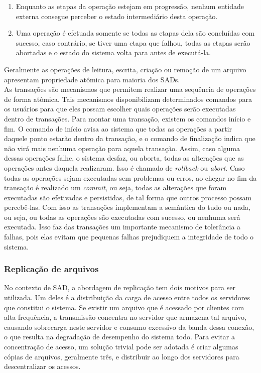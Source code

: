 	\begin{enumerate}
	\item Enquanto as etapas da operação estejam em progressão, nenhum entidade externa consegue perceber o estado intermediário desta operação.
	\item Uma operação é efetuada somente se todas as etapas dela são concluídas com sucesso, caso contrário, se tiver uma etapa que falhou, todas as etapas serão abortadas e o estado do sistema volta para antes de executá-la.
	\end{enumerate}
	
	Geralmente as operações de leitura, escrita, criação ou remoção de um arquivo apresentam propriedade atômica para maioria dos SADs.\\
	
	As transações são mecanismos que permitem realizar uma sequência de operações de forma atômica. Tais mecanismos disponibilizam determinados comandos para os usuários para que eles possam escolher quais operações serão executadas dentro de transações. Para montar uma transação, existem os comandos início e fim. O comando de início avisa ao sistema que todas as operações a partir daquele ponto estarão dentro da transação, e o comando de finalização indica que não virá mais nenhuma operação para aquela transação.
	Assim, caso alguma dessas operações falhe, o sistema desfaz, ou aborta, todas as alterações que as operações antes daquela realizaram. Isso é chamado de \textit{rollback} ou \textit{abort}. Caso todas as operações sejam executadas sem problemas ou erros, ao chegar no fim da transação é realizado um \textit{commit}, ou seja, todas as alterações que foram executadas são efetivadas e persistidas, de tal forma que outros processo possam percebê-las. Com isso as transações implementam a semântica do tudo ou nada, ou seja, ou todas as operações são executadas com sucesso, ou nenhuma será executada. Isso faz das transações um importante mecanismo de tolerância a falhas, pois elas evitam que pequenas falhas prejudiquem a integridade de todo o sistema.
	
	\subsubsection{Replicação de arquivos}
	No contexto de SAD, a abordagem de replicação tem dois motivos para ser utilizada. 
	Um deles é a distribuição da carga de acesso entre todos os servidores que constitui o sistema. 
	Se existir um arquivo que é acessado por clientes com alta frequência, a transmissão concentra no servidor que armazena tal arquivo, causando sobrecarga neste servidor e consumo excessivo da banda dessa conexão, o que resulta na degradação de desempenho do sistema todo. 
	Para evitar a concentração de acesso, um solução trivial pode ser adotada é criar algumas cópias de arquivos, geralmente três, e distribuir ao longo dos servidores para descentralizar os acessos. \\
	
